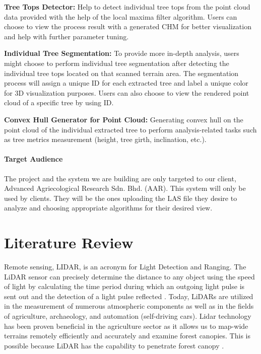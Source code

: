 \documentclass[a4paper, 12pt]{article}
\begin{document}
\textbf{Tree Tops Detector:} Help to detect individual tree tops from the point cloud data provided with the help of the local maxima filter algorithm. Users can choose to view the process result with a generated CHM for better visualization and help with further parameter tuning.

\textbf{Individual Tree Segmentation:} To provide more in-depth analysis, users might choose to perform individual tree segmentation after detecting the individual tree tops located on that scanned terrain area. The segmentation process will assign a unique ID for each extracted tree and label a unique color for 3D visualization purposes. Users can also choose to view the rendered point cloud of a specific tree by using ID.

\textbf{Convex Hull Generator for Point Cloud:} Generating convex hull on the point cloud of the individual extracted tree to perform analysis-related tasks such as tree metrics measurement (height, tree girth, inclination, etc.).

\paragraph{Target Audience}

The project and the system we are building are only targeted to our client, Advanced Agriecological Research Sdn. Bhd. (AAR). This system will only be used by clients. They will be the ones uploading the LAS file they desire to analyze and choosing appropriate algorithms for their desired view.


\section{Literature Review}

Remote sensing, LIDAR, is an acronym for Light Detection and Ranging. The LiDAR sensor can precisely determine the distance to any object using the speed of light by calculating the time period during which an outgoing light pulse is sent out and the detection of a light pulse reflected \cite{4}. Today, LiDARs are utilized in the measurement of numerous atmospheric components as well as in the fields of agriculture, archaeology, and automation (self-driving cars). Lidar technology has been proven beneficial in the agriculture sector as it allows us to map-wide terrains remotely efficiently and accurately and examine forest canopies. This is possible because LiDAR has the capability to penetrate forest canopy \cite{2}. 
\end{document}

